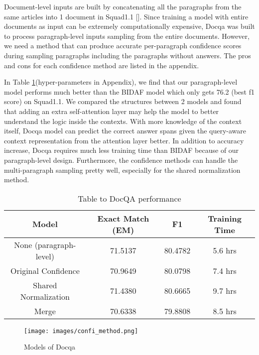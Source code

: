 \documentclass{article}
\begin{document}
 Document-level inputs are built by concatenating all the paragraphs from the same articles into 1 document in Squad1.1 [].
Since training a model with entire documents as input can be extremely computationally expensive, Docqa was built to process paragraph-level inputs sampling from the entire documents. However, we need a method that can produce accurate per-paragraph confidence scores during sampling paragraphs including the paragraphs without answers. The pros and cons for each confidence method are listed in the appendix.

In Table \ref{table:1}(hyper-parameters in Appendix), we find that our paragraph-level model performs much better than the BIDAF model which only gets 76.2 (best f1 score) on Squad1.1. We compared the structures between 2 models and found that adding an extra self-attention layer may help the model to better understand the logic inside the contexts. With more knowledge of the context itself, Docqa model can predict the correct answer spans given the query-aware context representation from the attention layer better. In addition to accuracy increase, Docqa requires much less training time than BIDAF because of our paragraph-level design. Furthermore, the confidence methods can handle the multi-paragraph sampling pretty well, especially for the shared normalization method.

\begin{table}[h!]
    \centering
     \begin{tabular}{||c c c c||} 
     \hline
     Model & Exact Match (EM) & F1 & Training Time \\
     \hline\hline
     None (paragraph-level) & 71.5137 & 80.4782 & 5.6 hrs \\ 
     Original Confidence & 70.9649 & 80.0798 & 7.4 hrs \\
     Shared Normalization & 71.4380 & 80.6665 & 9.7 hrs \\
     Merge & 70.6338 & 79.8808 & 8.5 hrs \\
     \hline\hline
    \end{tabular}
    \caption{Table to DocQA performance}
    \label{table:1}
\end{table}
\begin{wrapfigure}{r}{0.35\textwidth} %
    \texttt{[image: images/confi\_method.png]}
      \centering
      \caption{Models of Docqa}
      \label{fig:docqamodels}
\end{wrapfigure}
\end{document}
